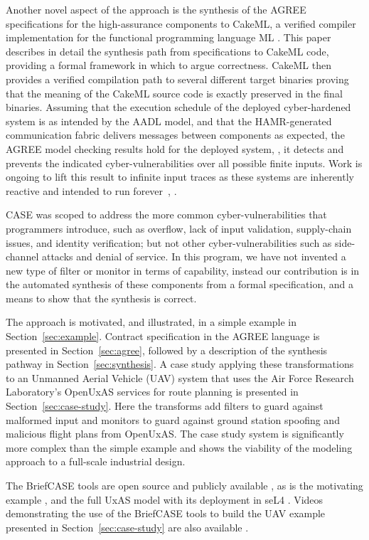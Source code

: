 Another novel aspect of the approach is the synthesis of the AGREE specifications for the high-assurance components to CakeML, a verified compiler implementation for the functional programming language ML \cite{cakeml}. This paper describes in detail the synthesis path from specifications to CakeML code, providing a formal framework in which to argue correctness. CakeML then provides a verified compilation path to several different target binaries proving that the meaning of the CakeML source code is exactly preserved in the final binaries. Assuming that the execution schedule of the deployed cyber-hardened system is as intended by the AADL model, and that the HAMR-generated communication fabric delivers messages between components as expected, the AGREE model checking results hold for the deployed system, \ie, it detects and prevents the indicated cyber-vulnerabilities over all possible finite inputs. Work is ongoing to lift this result to infinite input traces as these systems are inherently reactive and intended to run forever~\cite{case-verified-filter}, \cite{cakeml-space-cost}.

CASE was scoped to address the more common cyber-vulnerabilities that programmers introduce, such as overflow, lack of input validation, supply-chain issues, and identity verification; but not other cyber-vulnerabilities such as side-channel attacks and denial of service.
In this program, we have not invented a new type of filter or monitor in terms of capability, instead our contribution is in the automated synthesis of these components from a formal specification, and a means to show that the synthesis is correct.

The approach is motivated, and illustrated, in a simple example in Section~\ref{sec:example}. Contract specification in the AGREE language is presented in Section~\ref{sec:agree}, followed by a description of the synthesis pathway in Section~\ref{sec:synthesis}. A case study applying these transformations to an Unmanned Aerial Vehicle (UAV) system that uses the Air Force Research Laboratory's OpenUxAS services for route planning is presented in Section~\ref{sec:case-study}. Here the transforms add filters to guard against malformed input and monitors to guard against ground station spoofing and malicious flight plans from OpenUxAS. The case study system is significantly more complex than the simple example and shows the viability of the modeling approach to a full-scale industrial design.

The BriefCASE tools are open source and publicly available \cite{fmide}, as is the motivating example \cite{repo}, and the full UxAS model with its deployment in seL4 \cite{phase2, camkes}.  Videos demonstrating the use of the BriefCASE tools to build the UAV example presented in Section~\ref{sec:case-study} are also available \cite{case}.
